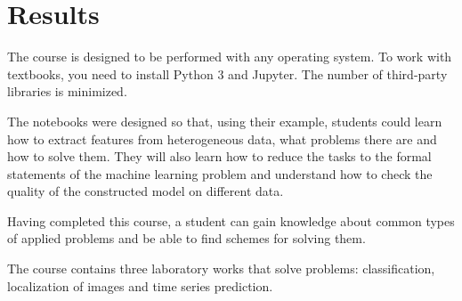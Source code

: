 \section{Results}

The course is designed to be performed with any operating system. To work with textbooks, you need to install Python 3 and Jupyter. The number of third-party libraries is minimized.

The notebooks were designed so that, using their example, students could learn how to extract features from heterogeneous data, what problems there are and how to solve them. They will also learn how to reduce the tasks to the formal statements of the machine learning problem and understand how to check the quality of the constructed model on different data.

Having completed this course, a student can gain knowledge about common types of applied problems and be able to find schemes for solving them.

The course contains three laboratory works that solve problems: classification, localization of images and time series prediction.